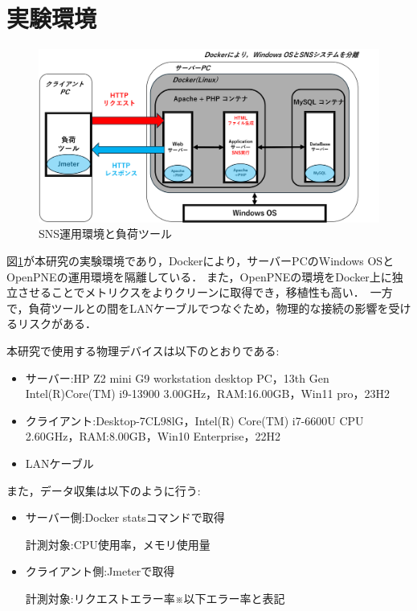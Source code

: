 \documentclass[twoside,twocolumn,10pt]{jarticle}  %
\begin{document}
\section{実験環境}
\label{sec:environment}
\begin{figure}
  \centering
  \includegraphics[scale=0.29]{figures/SNS_Docker.png}
  \vspace{0.05cm}
  \caption{SNS運用環境と負荷ツール}
  \label{fig:1}
\end{figure}
図\ref{fig:1}が本研究の実験環境であり，Dockerにより，サーバーPCのWindows OSとOpenPNEの運用環境を隔離している．
また，OpenPNEの環境をDocker上に独立させることでメトリクスをよりクリーンに取得でき，移植性も高い．\
一方で，負荷ツールとの間をLANケーブルでつなぐため，物理的な接続の影響を受けるリスクがある．

本研究で使用する物理デバイスは以下のとおりである:
\begin{itemize}
  \setlength\baselineskip{6pt}
  \setlength{\parskip}{0cm} %
  \setlength{\itemsep}{0cm} %
  \item サーバー:HP Z2 mini G9 workstation desktop PC，13th Gen Intel(R)Core(TM) i9-13900 3.00GHz，RAM:16.00GB，Win11 pro，23H2
  \item クライアント:Desktop-7CL98lG，Intel(R) Core(TM) i7-6600U CPU 2.60GHz，RAM:8.00GB，Win10 Enterprise，22H2
  \item LANケーブル
\end{itemize}
また，データ収集は以下のように行う:
\begin{itemize}
  \setlength\baselineskip{6pt}
  \setlength{\parskip}{0cm} %
  \setlength{\itemsep}{0cm} %
  \item サーバー側:Docker statsコマンドで取得\par
  計測対象:CPU使用率，メモリ使用量
  \item クライアント側:Jmeterで取得\par
  計測対象:リクエストエラー率※以下エラー率と表記
\end{itemize}
\end{document}
